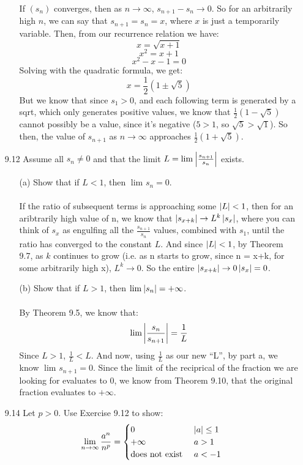 \begin{itemize}
\begin{itemize}
        If $(s_n)$ converges, then as $n \rightarrow \infty$, $s_{n+1} - s_n \rightarrow 0$. So for an arbitrarily high $n$, we can say that $s_{n+1} = s_n = x$, where $x$ is just a temporarily variable. Then, from our recurrence relation we have:
        $$x = \sqrt{x + 1}$$
        $$x^2 = x + 1$$
        $$x^2 - x - 1 = 0$$
        Solving with the quadratic formula, we get:
        $$x = \frac{1}{2}(1 \pm \sqrt{5})$$
        But we know that since $s_1 > 0$, and each following term is generated by a sqrt, which only generates positive values, we know that $\frac{1}{2}(1 - \sqrt{5})$ cannot possibly be a value, since it's negative ($5 > 1$, so $\sqrt{5} > \sqrt{1}$). So then, the value of $s_{n+1}$ as $n \rightarrow \infty$ approaches $\frac{1}{2}(1 + \sqrt{5})$.\\        
    \end{itemize}

  \item [9.12]
    Assume all $s_n \neq 0$ and that the limit $L = \lim_{} \left\vert \frac{s_{n+1}}{s_n} \right\vert$ exists.
    \begin{itemize}
      \item [(a)] Show that if $L < 1$, then $\lim_{} s_n = 0$.\\\\
        
        If the ratio of subsequent terms is approaching some $\left\vert L \right\vert < 1$, then for an aribtrarily high value of n, we know that $\left\vert s_{x+k} \right\vert \rightarrow L^k \left\vert s_x \right\vert$, where you can think of $s_x$ as engulfing all the $\frac{s_{n+1}}{s_n}$ values, combined with $s_1$, until the ratio has converged to the constant $L$. And since $\left\vert L \right\vert < 1$, by Theorem 9.7, as $k$ continues to grow (i.e. as n starts to grow, since n = x+k, for some arbitrarily high x), $L^k \rightarrow 0$. So the entire $\left\vert s_{x+k} \right\vert \rightarrow 0\left\vert s_x \right\vert = 0$.
        
      \item [(b)] Show that if $L > 1$, then $\lim_{} \left\vert s_n \right\vert = + \infty$.\\\\
        
        By Theorem 9.5, we know that:
        $$\lim_{} \left\vert \frac{s_n}{s_{n+1}} \right\vert = \frac{1}{L}$$
        Since $L > 1$, $\frac{1}{L} < L$. And now, using $\frac{1}{L}$ as our new ``L'', by part a, we know $\lim_{} s_{n+1} = 0$. Since the limit of the reciprical of the fraction we are looking for evaluates to 0, we know from Theorem 9.10, that the original fraction evaluates to $+ \infty$.
    \end{itemize}
  \item [9.14]
    Let $p > 0$. Use Exercise 9.12 to show:
    $$\lim_{n \rightarrow \infty} \frac{a^n}{n^p} = 
    \begin{cases} 
        0 & \left\vert a \right\vert \leq 1 \\
        +\infty & a > 1\\
        \text{does not exist } & a < -1
    \end{cases}
    $$\\\\


\end{itemize}
